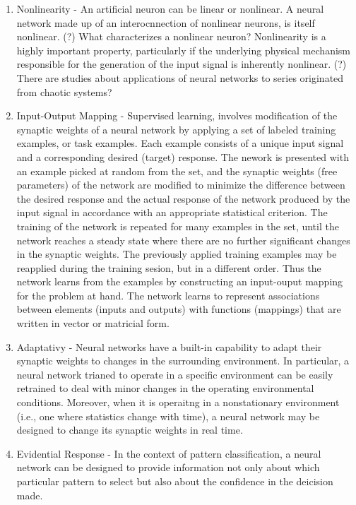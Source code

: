 \documentclass[twocolumn]{article}
\begin{document}
	 \begin{enumerate}
		 \item Nonlinearity - An artificial neuron can be linear or nonlinear. A neural network made up of an interocnnection of nonlinear neurons, is itself nonlinear. (?) What characterizes a nonlinear neuron?
		       Nonlinearity is a highly important property, particularly if the underlying physical mechanism responsible for the generation of the input signal is inherently nonlinear. (?) There are studies about applications of neural networks to series originated from chaotic systems?
		 \item  Input-Output Mapping - Supervised learning, involves modification of the synaptic weights of a neural network by applying a set of labeled training examples, or task examples. Each example consists of a unique input signal and a corresponding desired (target) response. The nework is presented with an example picked at random from the set, and the synaptic weights (free parameters) of the network are modified to minimize the difference between the desired response and the actual response of the network produced by the input signal in accordance with an appropriate statistical criterion. The training of the network is repeated for many examples in the set, until the network reaches a steady state where there are no further significant changes in the synaptic weights. The previously applied training examples may be reapplied during the training sesion, but in a different order. Thus the network learns from the examples by constructing an input-ouput mapping for the problem at hand.
		       The network learns to represent associations between elements (inputs and outputs) with functions (mappings) that are written in vector or matricial form.
		 \item Adaptativy - Neural networks have a built-in capability to adapt their synaptic weights to changes in the surrounding environment. In particular, a neural network trianed to operate in a specific environment can be easily retrained to deal with minor changes in the operating environmental conditions. Moreover, when it is operaitng in a nonstationary environment (i.e., one where statistics change with time), a neural network may be designed to change its synaptic weights in real time.
		 \item Evidential Response - In the context of pattern classification, a neural network can be designed to provide information not only about which particular pattern to select but also about the confidence in the deicision made.

\end{enumerate}
\end{document}
